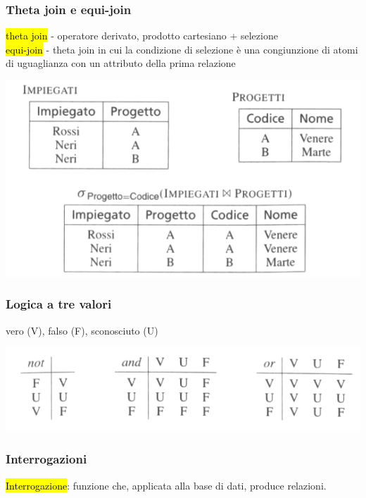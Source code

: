 \documentclass[a4paper]{article}
\begin{document}
\subsubsection{Theta join e equi-join}
\hl{theta join} - operatore derivato, prodotto cartesiano + selezione\medskip\\
\hl{equi-join} - theta join in cui la condizione di selezione è una congiunzione di atomi di uguaglianza con un attributo della prima relazione
\begin{center}
      \includegraphics[scale=0.45]{img/ar10.png}
\end{center}

\subsubsection{Logica a tre valori}
vero (V), falso (F), sconosciuto (U)
\begin{center}
      \includegraphics[scale=0.45]{img/ar11.png}
\end{center}

\subsubsection{Interrogazioni}
\hl{Interrogazione}: funzione che, applicata alla base di dati, produce relazioni.
\end{document}

